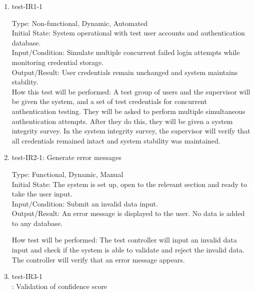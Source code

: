 \documentclass[12pt, titlepage]{article}
\begin{document}
\begin{enumerate}
    \item{test-IR1-1\\}  \label{test-IR1-1}
    
    Type: Non-functional, Dynamic, Automated\\
    
    Initial State: System operational with test user accounts and authentication database.\\
    
    Input/Condition: Simulate multiple concurrent failed login attempts while monitoring credential storage.\\
    
    Output/Result: User credentials remain unchanged and system maintains stability.\\
    
    How this test will be performed: A test group of users and the supervisor will be given the system, and a set of test credentials for concurrent authentication testing. They will be asked to perform multiple simultaneous authentication attempts. After they do this, they will be given a system integrity survey. In the system integrity survey, the supervisor will verify that all credentials remained intact and system stability was maintained.



    \item{test-IR2-1}: Generate error messages \label{test-IR2-1}
    
    Type: Functional, Dynamic, Manual\\
    
    Initial State: The system is set up, open to the relevant section and ready to take the user input.\\
    
    Input/Condition: Submit an invalid data input.\\
    
    Output/Result: An error message is displayed to the user. No data is added to any database. 
    
    How test will be performed: The test controller will input an invalid data input and check if the system is able to validate and reject the invalid data. The controller will verify that an error message appears.


    \item{test-IR3-1\\}: Validation of confidence score  \label{test-IR3-1}
    

\end{enumerate}
\end{document}
